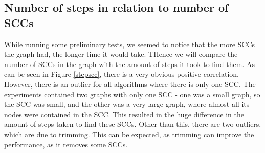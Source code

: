 \documentclass[../master/master.tex]{subfiles}
\begin{document}
\subsection{Number of steps in relation to number of SCCs}
While running some preliminary tests, we seemed to notice that the more SCCs the graph had, the longer time it would take. THence we will compare the number of SCCs in the graph with the amount of steps it took to find them. As can be seen in Figure \ref{stepscc}, there is a very obvious positive correlation. However, there is an outlier for all algorithms where there is only one SCC. The experiments contained two graphs with only one SCC - one was a small graph, so the SCC was small, and the other was a very large graph, where almost all its nodes were contained in the SCC. This resulted in the huge difference in the amount of steps taken to find these SCCs. Other than this, there are two outliers, which are due to trimming. This can be expected, as trimming can improve the performance, as it removes some SCCs.
\end{document}
